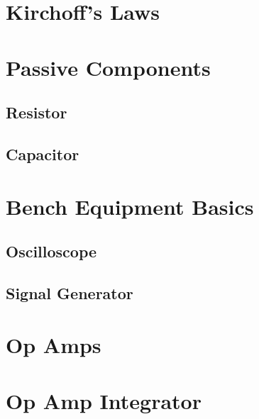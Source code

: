 \documentclass{memoir}
\begin{document}
	
	
	\section{Kirchoff's Laws}
	
	\section{Passive Components}
	\subsection{Resistor}
	\subsection{Capacitor}
	
	\section{Bench Equipment Basics}
	\subsection{Oscilloscope}
	\subsection{Signal Generator}
	
	\section{Op Amps}
	
	\section{Op Amp Integrator}
	
\end{document}
